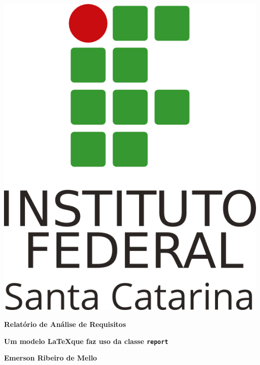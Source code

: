 \documentclass[11pt]{report}
\begin{document}

\pagestyle{empty}

\begin{center}

\includegraphics[scale=1.1]{figuras/ifsc-logo-v}
\vspace{8cm}

{\huge \bfseries Relatório de Análise de Requisitos}

\vspace{.5cm}

{\large \bfseries Um modelo \LaTeX que faz uso da classe \texttt{report}}

\vfill

{\large \bfseries Emerson Ribeiro de Mello}

\end{center}
\end{document}

